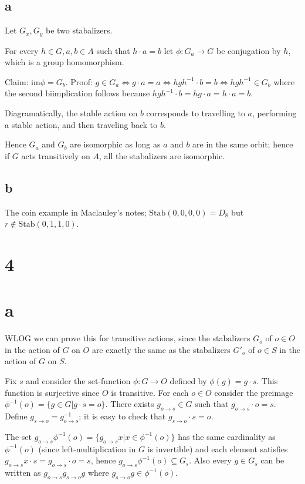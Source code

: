 \documentclass{article}
\def\inv{{-1}}
\def\im{\textrm{im}}
\def\Stab{\textrm{Stab}}
\begin{document}
\subsection*{a}

Let $G_x, G_y$ be two stabalizers.

For every $h \in G, a, b \in A$ such that $h \cdot a = b$ let $\phi: G_a \to G$ be conjugation by $h$, which is a group homomorphism.

Claim: $\im \phi = G_b$. Proof: $g \in G_a \iff g \cdot a = a \iff h g h^\inv \cdot b = b \iff hgh^\inv \in G_b$ where the second biimplication follows because $hgh^\inv \cdot b = hg \cdot a = h \cdot a = b$.

Diagramatically, the stable action on $b$ corresponds to travelling to $a$, performing a stable action, and then traveling back to $b$.

Hence $G_a$ and $G_b$ are isomorphic as long as $a$ and $b$ are in the same orbit; hence if $G$ acts transitively on $A$, all the stabalizers are isomorphic.

\subsection*{b}

The coin example in Maclauley's notes; $\Stab(0,0,0,0) = D_8$ but $r \not\in \Stab(0,1,1,0)$.

\section*{4}

\section*{a}

WLOG we can prove this for transitive actions, since the stabalizers $G_o$ of $o \in O$ in the action of $G$ on $O$ are exactly the same as the stabalizers $G'_o$ of $o \in S$ in the action of $G$ on $S$.

Fix $s$ and consider the set-function $\phi : G \to O$ defined by $\phi(g) = g \cdot s$. This function is surjective since $O$ is transitive. For each $o \in O$ consider the preimage $\phi^\inv(o) = \{g \in G | g \cdot s = o \}$. There exists $g_{o \to s} \in G$ such that $g_{o \to s} \cdot o = s$. Define $g_{s \to o} = g_{o \to s}^\inv$; it is easy to check that $g_{s \to o} \cdot s = o$.

The set $g_{o \to s} \phi^\inv(o) = \{g_{o \to s} x | x \in \phi^\inv(o)\}$ has the same cardinality as $\phi^\inv(o)$ (since left-multiplication in $G$ is invertible) and each element satisfies $g_{o \to s}x \cdot s = g_{o \to s} \cdot o = s$, hence $g_{o \to s}\phi^\inv(o) \subseteq G_s$. Also every $g \in G_s$ can be written as $g_{o \to s} g_{s \to o} g$ where $g_{s \to o}g \in \phi^\inv(o)$.
\end{document}
